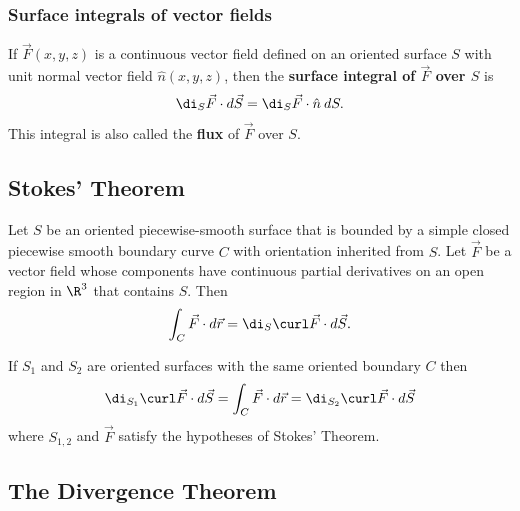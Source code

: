\documentclass{article}
\begin{document}
\subsubsection{Surface integrals of vector fields}

\begin{definition}
    If $\vec F(x,y,z)$ is a continuous vector field defined on an oriented surface $S$ with
    unit normal vector field $\hat n(x,y,z)$, then the \textbf{surface integral of $\vec F$ over
        $S$} is
    \begin{align*}
        \di_S \vec F\cdot d\vec S = \di_S \vec F\cdot \hat n\:dS.
    \end{align*}
    This integral is also called the \textbf{flux} of $\vec F$ over $S$.
\end{definition}


\subsection{Stokes' Theorem}

\begin{theorem}
    Let $S$ be an oriented piecewise-smooth surface that is bounded by a simple closed
    piecewise smooth boundary curve $C$ with orientation inherited from $S$. Let $\vec F$
    be a vector field whose components have continuous partial derivatives on an open
    region in $\R^3$ that contains $S$. Then
    \begin{align*}
        \int_C \vec F\cdot d\vec r = \di_S \curl \vec F\cdot d\vec S.
    \end{align*}
\end{theorem}
\begin{corollary}
    If $S_1$ and $S_2$ are oriented surfaces with the same oriented boundary $C$ then
    \begin{align*}
        \di_{S_1}\curl \vec F\cdot d\vec S = \int_C \vec F\cdot d\vec r = \di_{S_2} \curl\vec F\cdot d\vec S
    \end{align*}
    where $S_{1,2}$ and $\vec F$ satisfy the hypotheses of Stokes' Theorem.
\end{corollary}


\subsection{The Divergence Theorem}
\end{document}
